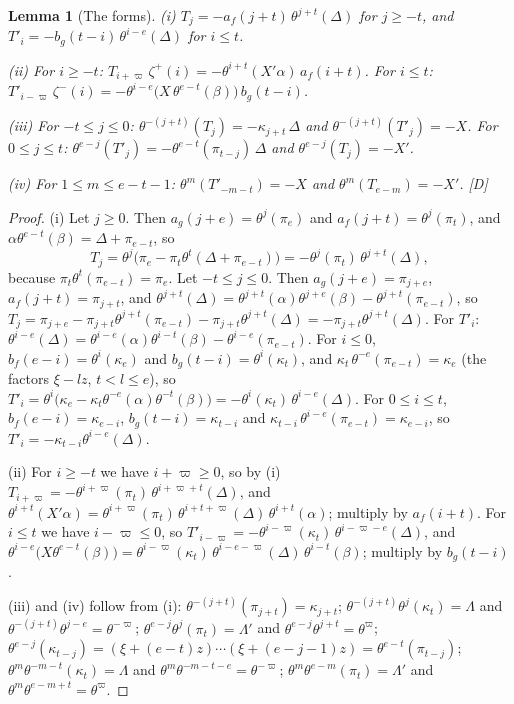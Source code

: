 \documentclass[11pt]{article}
\newtheorem{lemma}{Lemma}
\theoremstyle{definition}
\theoremstyle{remark}
\begin{document}
\begin{lemma}[The forms]\label{lem:exptforms}
(i) $T_j=-a_f(j+t)\,\theta^{j+t}(\Delta)$ for $j\ge-t$, and $T'_i=-b_g(t-i)\,\theta^{i-e}(\Delta)$ for $i\le t$.

(ii) For $i\ge-t$: $T_{i+\varpi}\,\zeta^+(i)=-\theta^{i+t}(X'\alpha)\,a_f(i+t)$. For $i\le t$: $T'_{i-\varpi}\,\zeta^-(i)=-\theta^{i-e}\bigl(X\,\theta^{e-t}(\beta)\bigr)\,b_g(t-i)$.

(iii) For $-t\le j\le0$: $\theta^{-(j+t)}(T_j)=-\kappa_{j+t}\,\Delta$ and $\theta^{-(j+t)}(T'_j)=-X$. For $0\le j\le t$: $\theta^{e-j}(T'_j)=-\theta^{e-t}(\pi_{t-j})\,\Delta$ and $\theta^{e-j}(T_j)=-X'$.

(iv) For $1\le m\le e-t-1$: $\theta^m(T'_{-m-t})=-X$ and $\theta^m(T_{e-m})=-X'$. [D]
\end{lemma}
\begin{proof}
(i) Let $j\ge0$. Then $a_g(j+e)=\theta^j(\pi_e)$ and $a_f(j+t)=\theta^j(\pi_t)$, and $\alpha\theta^{e-t}(\beta)=\Delta+\pi_{e-t}$, so
\[
T_j=\theta^j\bigl(\pi_e-\pi_t\theta^t(\Delta+\pi_{e-t})\bigr)=-\theta^j(\pi_t)\,\theta^{j+t}(\Delta),
\]
because $\pi_t\theta^t(\pi_{e-t})=\pi_e$. Let $-t\le j\le0$. Then $a_g(j+e)=\pi_{j+e}$, $a_f(j+t)=\pi_{j+t}$, and $\theta^{j+t}(\Delta)=\theta^{j+t}(\alpha)\theta^{j+e}(\beta)-\theta^{j+t}(\pi_{e-t})$, so $T_j=\pi_{j+e}-\pi_{j+t}\theta^{j+t}(\pi_{e-t})-\pi_{j+t}\theta^{j+t}(\Delta)=-\pi_{j+t}\theta^{j+t}(\Delta)$. For $T'_i$: $\theta^{i-e}(\Delta)=\theta^{i-e}(\alpha)\theta^{i-t}(\beta)-\theta^{i-e}(\pi_{e-t})$. For $i\le0$, $b_f(e-i)=\theta^{i}(\kappa_e)$ and $b_g(t-i)=\theta^{i}(\kappa_t)$, and $\kappa_t\,\theta^{-e}(\pi_{e-t})=\kappa_e$ (the factors $\xi-lz$, $t<l\le e$), so $T'_i=\theta^{i}\bigl(\kappa_e-\kappa_t\theta^{-e}(\alpha)\theta^{-t}(\beta)\bigr)=-\theta^{i}(\kappa_t)\,\theta^{i-e}(\Delta)$. For $0\le i\le t$, $b_f(e-i)=\kappa_{e-i}$, $b_g(t-i)=\kappa_{t-i}$ and $\kappa_{t-i}\,\theta^{i-e}(\pi_{e-t})=\kappa_{e-i}$, so $T'_i=-\kappa_{t-i}\theta^{i-e}(\Delta)$.

(ii) For $i\ge-t$ we have $i+\varpi\ge0$, so by (i) $T_{i+\varpi}=-\theta^{i+\varpi}(\pi_t)\,\theta^{i+\varpi+t}(\Delta)$, and $\theta^{i+t}(X'\alpha)=\theta^{i+\varpi}(\pi_t)\,\theta^{i+t+\varpi}(\Delta)\,\theta^{i+t}(\alpha)$; multiply by $a_f(i+t)$. For $i\le t$ we have $i-\varpi\le0$, so $T'_{i-\varpi}=-\theta^{i-\varpi}(\kappa_t)\,\theta^{i-\varpi-e}(\Delta)$, and $\theta^{i-e}\bigl(X\theta^{e-t}(\beta)\bigr)=\theta^{i-\varpi}(\kappa_t)\,\theta^{i-e-\varpi}(\Delta)\,\theta^{i-t}(\beta)$; multiply by $b_g(t-i)$.

(iii) and (iv) follow from (i): $\theta^{-(j+t)}(\pi_{j+t})=\kappa_{j+t}$; $\theta^{-(j+t)}\theta^{j}(\kappa_t)=\Lambda$ and $\theta^{-(j+t)}\theta^{j-e}=\theta^{-\varpi}$; $\theta^{e-j}\theta^{j}(\pi_t)=\Lambda'$ and $\theta^{e-j}\theta^{j+t}=\theta^{\varpi}$; $\theta^{e-j}(\kappa_{t-j})=(\xi+(e-t)z)\cdots(\xi+(e-j-1)z)=\theta^{e-t}(\pi_{t-j})$; $\theta^m\theta^{-m-t}(\kappa_t)=\Lambda$ and $\theta^m\theta^{-m-t-e}=\theta^{-\varpi}$; $\theta^m\theta^{e-m}(\pi_t)=\Lambda'$ and $\theta^m\theta^{e-m+t}=\theta^{\varpi}$.
\end{proof}
\end{document}
